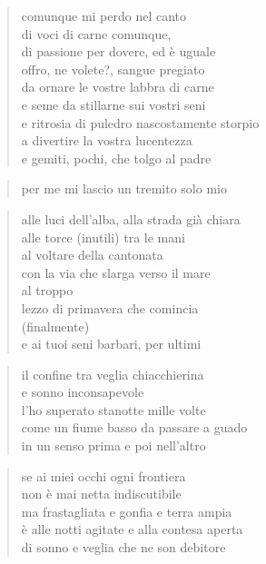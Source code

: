 \clearpage


\begin{verse}
    comunque mi perdo nel canto\\
    di voci di carne comunque,\\
    di passione per dovere, ed è uguale\\
    offro, ne volete?, sangue pregiato\\
    da ornare le vostre labbra di carne\\
    e seme da stillarne sui vostri seni\\
    e ritrosia di puledro nascostamente storpio\\
    a divertire la vostra lucentezza\\
    e gemiti, pochi, che tolgo al padre
\end{verse}

\begin{verse}
    per me mi lascio un tremito solo mio
\end{verse}

\clearpage


\begin{verse}
    alle luci dell'alba, alla strada già chiara\\
    alle torce (inutili) tra le mani\\
    al voltare della cantonata\\
    con la via che slarga verso il mare\\
    al troppo\\
    lezzo di primavera che comincia\\
    (finalmente)\\
    e ai tuoi seni barbari, per ultimi
\end{verse}

\clearpage


\begin{verse}
    il confine tra veglia chiacchierina\\
    e sonno inconsapevole\\
    l'ho superato stanotte mille volte\\
    come un fiume basso da passare a guado\\
    in un senso prima e poi nell'altro
\end{verse}

\begin{verse}
    se ai miei occhi ogni frontiera\\
    non è mai netta indiscutibile\\
    ma frastagliata e gonfia e terra ampia\\
    è alle notti agitate e alla contesa aperta\\
    di sonno e veglia che ne son debitore
\end{verse}

